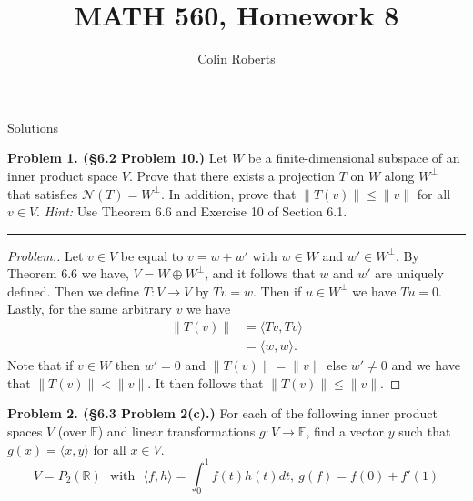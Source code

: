 \documentclass[leqno]{article}
\author{Colin Roberts}
\title{MATH 560, Homework 8}
\theoremstyle{nonumberplain}
\newtheorem{proof}{Proof}
\newcommand{\R}{\mathbb{R}}
\begin{document}
\maketitle
\begin{large}
\begin{center}
Solutions
\end{center}
\end{large}
\pagebreak

\noindent\textbf{Problem 1. (\S 6.2 Problem 10.)} Let $W$ be a finite-dimensional subspace of an inner product space $V$. Prove that there exists a projection $T$ on $W$ along $W^\perp$ that satisfies $\mathcal{N}(T)=W^\perp$. In addition, prove that $\|T(v)\|\leq \|v\|$ for all $v\in V$. \emph{Hint:} Use Theorem 6.6 and Exercise 10 of Section 6.1.

\noindent\rule[0.5ex]{\linewidth}{1pt}

\begin{proof}[Problem.]
Let $v\in V$ be equal to $v=w+w'$ with $w\in W$ and $w'\in W^\perp$.  By Theorem 6.6 we have, $V=W\oplus W^\perp$, and it follows that $w$ and $w'$ are uniquely defined.  Then we define $T\colon V \to V$ by $Tv=w$. Then if $u\in W^\perp$ we have $Tu=0$. Lastly, for the same arbitrary $v$ we have
\begin{align*}
\|T(v)\|&= \langle Tv,Tv\rangle\\
&= \langle w,w \rangle. 
\end{align*}
Note that if $v\in W$ then $w'=0$ and $\|T(v)\|=\|v\|$ else $w'\neq 0$ and we have that $\|T(v)\|<\|v\|$. It then follows that $\|T(v)\|\leq \|v\|$.
\end{proof}



\pagebreak



\noindent\textbf{Problem 2. (\S 6.3 Problem 2(c).)} For each of the following inner product spaces $V$ (over $\mathbb{F}$) and linear transformations $g\colon V \to \mathbb{F}$, find a vector $y$ such that $g(x)=\langle x,y\rangle$ for all $x\in V$.
\[
V=P_2(\R) \textrm{~ with ~} \langle f,h \rangle =\int_0^1 f(t)h(t)dt, ~g(f)=f(0)+f'(1)
\]
\end{document}
